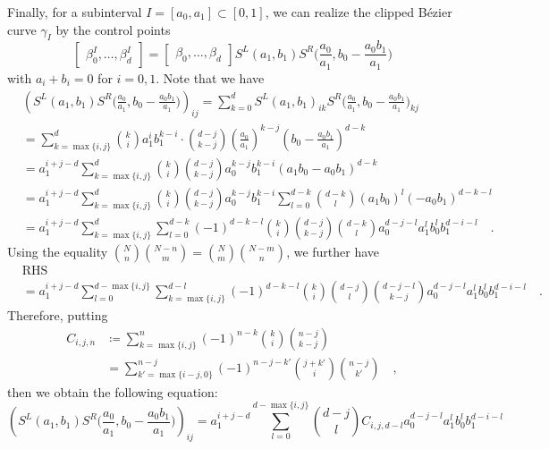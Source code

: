 \documentclass[pdftex,a4paper,12pt]{scrartcl}
\theoremstyle{plain}
\theoremstyle{definition}
\theoremstyle{remark}
\numberwithin{equation}{section}
\begin{document}
Finally, for a subinterval $I=[a_0,a_1]\subset[0,1]$, we can realize the clipped B\'ezier curve $\gamma_I$ by the control points
\[
\begin{bmatrix}
\beta^I_0,\dots,\beta^I_d
\end{bmatrix}
=
\begin{bmatrix}
\beta_0,\dots,\beta_d
\end{bmatrix}
S^L(a_1,b_1)S^R\bigl(\frac{a_0}{a_1},b_0-\frac{a_0b_1}{a_1}\bigr)
\]
with $a_i+b_i=0$ for $i=0,1$.
Note that we have
\[
\begin{split}
&\left(S^L(a_1,b_1)S^R\bigl(\frac{a_0}{a_1},b_0-\frac{a_0b_1}{a_1}\bigr)\right)_{ij}
= \sum_{k=0}^d S^L(a_1,b_1)_{ik}S^R\bigl(\frac{a_0}{a_1},b_0-\frac{a_0b_1}{a_1}\bigr)_{kj} \\
&= \sum_{k=\max\{i,j\}}^d\binom{k}{i}a_1^ib_1^{k-i}\cdot\binom{d-j}{k-j}\left(\frac{a_0}{a_1}\right)^{k-j}\left(b_0-\frac{a_0b_1}{a_1}\right)^{d-k} \\
&= a_1^{i+j-d}\sum_{k=\max\{i,j\}}^d\binom{k}{i}\binom{d-j}{k-j}a_0^{k-j}b_1^{k-i}(a_1b_0-a_0b_1)^{d-k} \\
&= a_1^{i+j-d}\sum_{k=\max\{i,j\}}^d\binom{k}{i}\binom{d-j}{k-j}a_0^{k-j}b_1^{k-i}\sum_{l=0}^{d-k}\binom{d-k}{l}(a_1b_0)^l(-a_0b_1)^{d-k-l} \\
&= a_1^{i+j-d}\sum_{k=\max\{i,j\}}^d\sum_{l=0}^{d-k} (-1)^{d-k-l}\binom{k}{i}\binom{d-j}{k-j}\binom{d-k}{l}a_0^{d-j-l}a_1^lb_0^lb_1^{d-i-l}
\quad.
\end{split}
\]
Using the equality $\binom{N}{n}\binom{N-n}{m} = \binom{N}{m}\binom{N-m}{n}$, we further have
\[
\begin{split}
&\mathrm{RHS} \\
&= a_1^{i+j-d}\sum_{l=0}^{d-\max\{i,j\}}\sum_{k=\max\{i,j\}}^{d-l} (-1)^{d-k-l}\binom{k}{i}\binom{d-j}{l}\binom{d-j-l}{k-j}a_0^{d-j-l}a_1^lb_0^lb_1^{d-i-l}
\quad.
\end{split}
\]
Therefore, putting
\begin{equation}
\label{eq:def-Cijn}
\begin{split}
C_{i,j,n}
&\coloneqq \sum_{k=\max\{i,j\}}^n (-1)^{n-k}\binom{k}{i}\binom{n-j}{k-j} \\
&=
\sum_{k'=\max\{i-j,0\}}^{n-j}(-1)^{n-j-k'}\binom{j+k'}{i}\binom{n-j}{k'}
\quad,
\end{split}
\end{equation}
then we obtain the following equation:
\begin{equation}
\label{eq:clip-coeff}
\left(S^L(a_1,b_1)S^R\bigl(\frac{a_0}{a_1},b_0-\frac{a_0b_1}{a_1}\bigr)\right)_{ij}
= a_1^{i+j-d}\sum_{l=0}^{d-\max\{i,j\}}\binom{d-j}{l}C_{i,j,d-l}a_0^{d-j-l}a_1^lb_0^lb_1^{d-i-l}
\end{equation}
\end{document}
